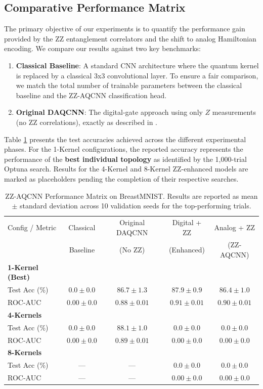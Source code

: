 \documentclass[11pt,a4paper]{article}
\begin{document}
\subsection{Comparative Performance Matrix}
The primary objective of our experiments is to quantify the performance gain provided by the ZZ entanglement correlators and the shift to analog Hamiltonian encoding. We compare our results against two key benchmarks:
\begin{enumerate}
    \item \textbf{Classical Baseline}: A standard CNN architecture where the quantum kernel is replaced by a classical 3x3 convolutional layer. To ensure a fair comparison, we match the total number of trainable parameters between the classical baseline and the ZZ-AQCNN classification head.
    \item \textbf{Original DAQCNN}: The digital-gate approach using only $Z$ measurements (no ZZ correlations), exactly as described in \cite{daqcnn2024}.
\end{enumerate}

Table \ref{tab:main_results} presents the test accuracies achieved across the different experimental phases. For the 1-Kernel configurations, the reported accuracy represents the performance of the \textbf{best individual topology} as identified by the 1,000-trial Optuna search. Results for the 4-Kernel and 8-Kernel ZZ-enhanced models are marked as placeholders pending the completion of their respective searches.

\begin{table}[htbp]
    \centering
    \caption{ZZ-AQCNN Performance Matrix on BreastMNIST. Results are reported as mean $\pm$ standard deviation across 10 validation seeds for the top-performing trials.}
    \begin{tabular}{l c c c c}
        \toprule
        Config / Metric & Classical & Original DAQCNN & Digital + ZZ & Analog + ZZ \\
                        & Baseline & (No ZZ) & (Enhanced) & (ZZ-AQCNN) \\
        \midrule
        \textbf{1-Kernel (Best)} & & & & \\
        Test Acc (\%) & $0.0 \pm 0.0$ & $86.7 \pm 1.3$ & $87.9 \pm 0.9$ & $86.4 \pm 1.0$ \\
        ROC-AUC       & $0.00 \pm 0.0$ & $0.88 \pm 0.01$ & $0.91 \pm 0.01$ & $0.90 \pm 0.01$ \\
        \midrule
        \textbf{4-Kernels} & & & & \\
        Test Acc (\%) & $0.0 \pm 0.0$ & $88.1 \pm 1.0$ & $0.0 \pm 0.0$ & $0.0 \pm 0.0$ \\
        ROC-AUC       & $0.00 \pm 0.0$ & $0.89 \pm 0.01$ & $0.00 \pm 0.0$ & $0.00 \pm 0.0$ \\
        \midrule
        \textbf{8-Kernels} & & & & \\
        Test Acc (\%) & ---   & ---   & $0.0 \pm 0.0$ & $0.0 \pm 0.0$ \\
        ROC-AUC       & ---   & ---   & $0.00 \pm 0.0$ & $0.00 \pm 0.0$ \\
        \bottomrule
    \end{tabular}
    \label{tab:main_results}
\end{table}
\end{document}
